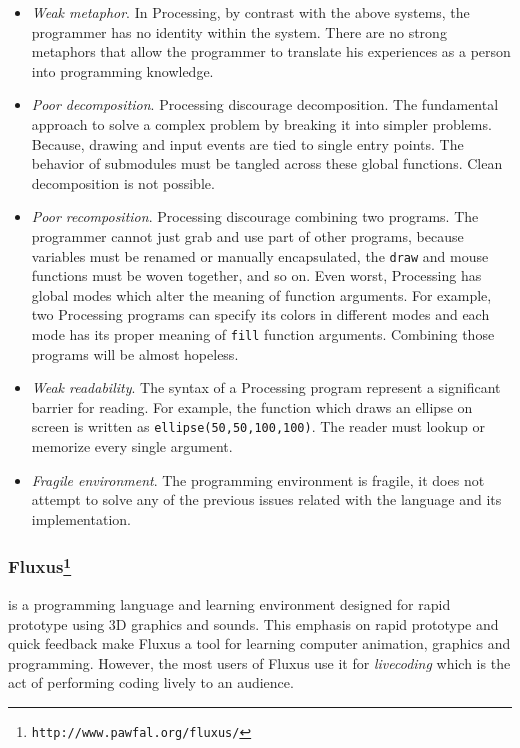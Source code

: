 \begin{itemize}
  \item \textit{Weak metaphor}. In Processing, by contrast with the above systems, the programmer has no identity within the system. There are no strong metaphors that allow the programmer to translate his experiences as a person into programming knowledge. 

  \item \textit{Poor decomposition}. Processing discourage decomposition. The fundamental approach to solve a complex problem by breaking it into simpler problems. Because, drawing and input events are tied to single entry points. The behavior of submodules must be tangled across these global functions. Clean decomposition is not possible.

  \item \textit{Poor recomposition}. Processing discourage combining two programs. The programmer cannot just grab and use part of other programs, because variables must be renamed or manually encapsulated, the \texttt{draw} and mouse functions must be woven together, and so on. Even worst, Processing has global modes which alter the meaning of function arguments. For example, two Processing programs can specify its colors in different modes and each mode has its proper meaning of \texttt{fill} function arguments. Combining those programs will be almost hopeless. 

  \item \textit{Weak readability}. The syntax of a Processing program represent a significant barrier for reading. For example, the function which draws an ellipse on screen is written as \texttt{ellipse(50,50,100,100)}. The reader must lookup or memorize every single argument. 

  \item \textit{Fragile environment}. The programming environment is fragile, it does not attempt to solve any of the previous issues related with the language and its implementation. 
\end{itemize}

\subsubsection{Fluxus\protect\footnote{\texttt{http://www.pawfal.org/fluxus/}}} is a programming language and learning environment designed for rapid prototype using 3D graphics and sounds. This emphasis on rapid prototype and quick feedback make Fluxus a tool for learning computer animation, graphics and programming. However, the most users of Fluxus use it for \textit{livecoding} which is the act of performing coding lively to an
audience.

